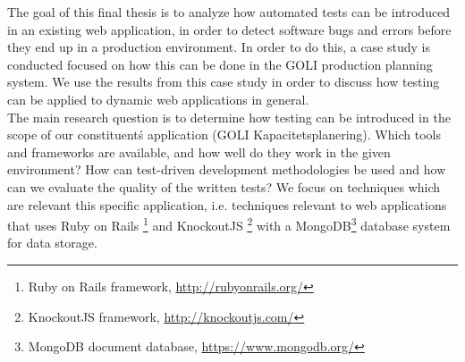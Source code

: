 
The goal of this final thesis is to analyze how automated tests can be
introduced in an existing web application, in order to detect software
bugs and errors before they end up in a production environment. In order
to do this, a case study is conducted focused on how this can be done in
the GOLI production planning system. We use the results from this case
study in order to discuss how testing can be applied to dynamic web
applications in general.\\

The main research question is to determine how testing can be introduced
in the scope of our constituent\'s application (GOLI
Kapacitetsplanering). Which tools and frameworks are available, and how
well do they work in the given environment? How can test-driven
development methodologies be used and how can we evaluate the quality of
the written tests? We focus on techniques which are relevant this
specific application, i.e. techniques relevant to web applications that
uses Ruby on Rails \footnote{Ruby on Rails framework,
\url{http://rubyonrails.org/}} and KnockoutJS \footnote{KnockoutJS
framework, \url{http://knockoutjs.com/}} with a MongoDB\footnote{MongoDB
document database, \url{https://www.mongodb.org/}} database system for
data storage.\\
